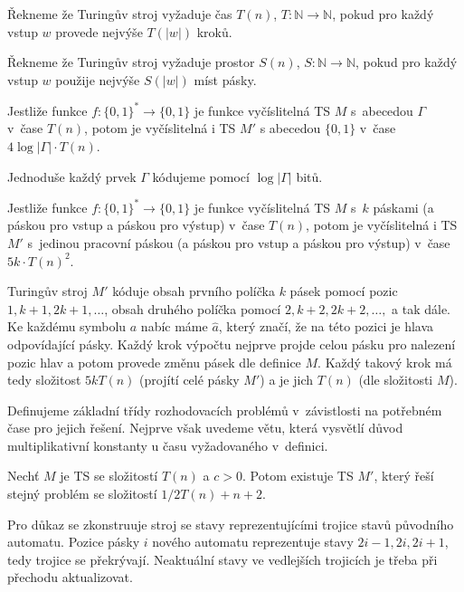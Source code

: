 \begin{definition}
Řekneme že Turingův stroj vyžaduje čas $T(n)$, $T : \mathbb{N} \to \mathbb{N}$,
pokud pro každý vstup $w$ provede nejvýše $T(\lvert w \rvert)$ kroků.

Řekneme že Turingův stroj vyžaduje prostor $S(n)$, $S : \mathbb{N} \to \mathbb{N}$,
pokud pro každý vstup $w$ použije nejvýše $S(\lvert w \rvert)$ míst
pásky.
\end{definition}

\begin{claim}
    Jestliže funkce $f : \{0, 1\}^* \to \{0, 1\}$ je funkce vyčíslitelná
    TS $M$ s~abecedou $\Gamma$ v~čase $T(n)$, potom je vyčíslitelná i
    TS $M'$ s abecedou $\{0,1\}$ v~čase $4 \log \lvert \Gamma \rvert
    \cdot T(n)$.
\end{claim}

Jednoduše každý prvek $\Gamma$ kódujeme pomocí $\log \lvert \Gamma
\rvert$ bitů.

\begin{claim}
    Jestliže funkce $f : \{0, 1\}^* \to \{0, 1\}$ je funkce vyčíslitelná
    TS $M$ s~$k$ páskami (a páskou pro vstup a páskou pro výstup) v~čase $T(n)$,
    potom je vyčíslitelná i TS $M'$ s~jedinou pracovní páskou (a páskou
    pro vstup a páskou pro výstup) v~čase
    $5 k \cdot T(n)^2$.
\end{claim}

Turingův stroj $M'$ kóduje obsah prvního políčka $k$ pásek pomocí pozic
$1, k+1, 2k+1,\ldots$, obsah druhého políčka pomocí $2, k+2,
2k+2,\ldots,$ a tak dále. Ke každému symbolu $a$ nabíc máme $\hat a$,
který značí, že na této pozici je hlava odpovídající pásky.
Každý krok výpočtu nejprve projde celou pásku pro nalezení pozic hlav
a potom provede změnu pásek dle definice $M$. Každý takový krok má tedy
složitost $5kT(n)$ (projítí celé pásky $M'$) a je jich $T(n)$ (dle složitosti $M$).

Definujeme základní třídy rozhodovacích problémů v~závistlosti
na potřebném čase pro jejich řešení. Nejprve však uvedeme větu, která
vysvětlí důvod multiplikativní konstanty u času vyžadovaného v~definici.

\begin{theorem}
    Nechť $M$ je TS se složitostí $T(n)$ a $c > 0$.
    Potom existuje TS $M'$, který řeší stejný problém
    se složitostí $1/2 T(n) + n + 2$.
\end{theorem}

Pro důkaz se zkonstruuje stroj se stavy reprezentujícími trojice stavů
původního automatu. Pozice pásky $i$ nového automatu reprezentuje stavy
$2i-1, 2i, 2i+1$, tedy trojice se překrývají. Neaktuální stavy ve
vedlejších trojicích je třeba při přechodu aktualizovat.

